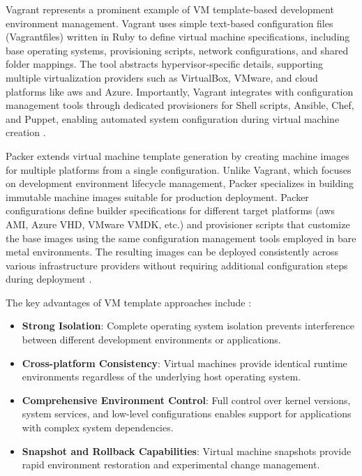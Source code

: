 Vagrant represents a prominent example of VM template-based development environment management.
Vagrant uses simple text-based configuration files (Vagrantfiles) written in Ruby to define virtual machine specifications, including base operating systems, provisioning scripts, network configurations, and shared folder mappings.
The tool abstracts hypervisor-specific details, supporting multiple virtualization providers such as VirtualBox, VMware, and cloud platforms like \ac{aws} and Azure.
Importantly, Vagrant integrates with configuration management tools through dedicated provisioners for Shell scripts, Ansible, Chef, and Puppet, enabling automated system configuration during virtual machine creation \citep{kolyasnikovExperimentalEvaluationVirtual2019}.

Packer extends virtual machine template generation by creating machine images for multiple platforms from a single configuration.
Unlike Vagrant, which focuses on development environment lifecycle management, Packer specializes in building immutable machine images suitable for production deployment.
Packer configurations define builder specifications for different target platforms (\ac{aws} AMI, Azure VHD, VMware VMDK, etc.) and provisioner scripts that customize the base images using the same configuration management tools employed in bare metal environments.
The resulting images can be deployed consistently across various infrastructure providers without requiring additional configuration steps during deployment \citep{hashicorpPackerHashiCorpDeveloper2025}.

The key advantages of VM template approaches include \citep{portnoyVirtualizationEssentials2016}:
\begin{itemize}
    \item \textbf{Strong Isolation}: Complete operating system isolation prevents interference between different development environments or applications.
    \item \textbf{Cross-platform Consistency}: Virtual machines provide identical runtime environments regardless of the underlying host operating system.
    \item \textbf{Comprehensive Environment Control}: Full control over kernel versions, system services, and low-level configurations enables support for applications with complex system dependencies.
    \item \textbf{Snapshot and Rollback Capabilities}: Virtual machine snapshots provide rapid environment restoration and experimental change management.
\end{itemize}

